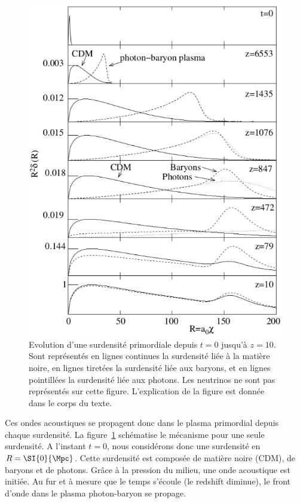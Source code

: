 \begin{figure}
  \centering
  \includegraphics[scale=0.5]{bao_schema}
  \caption{Evolution d'une surdensité primordiale depuis $t=0$ jusqu'à $z=10$. Sont représentés en lignes continues la surdensité liée à la matière noire, en lignes tiretées la surdensité liée aux baryons, et en lignes pointillées la surdensité liée aux photons. Les neutrinos ne sont pas représentés sur cette figure. L'explication de la figure est donnée dans le corps du texte.}
  \label{fig:bao_schema}
\end{figure}
Ces ondes acoustiques se propagent donc dans le plasma primordial depuis chaque surdensité. La figure~\ref{fig:bao_schema} schématise le mécanisme pour une seule surdensité. A l'instant $t=0$, nous considérons donc une surdensité en $R = \SI{0}{\Mpc}$. Cette surdensité est composée de matière noire (CDM), de baryons et de photons.
Grâce à la pression du milieu, une onde acoustique est initiée. 
Au fur et à mesure que le temps s'écoule (le redshift diminue), le front d'onde dans le plasma photon-baryon se propage.
